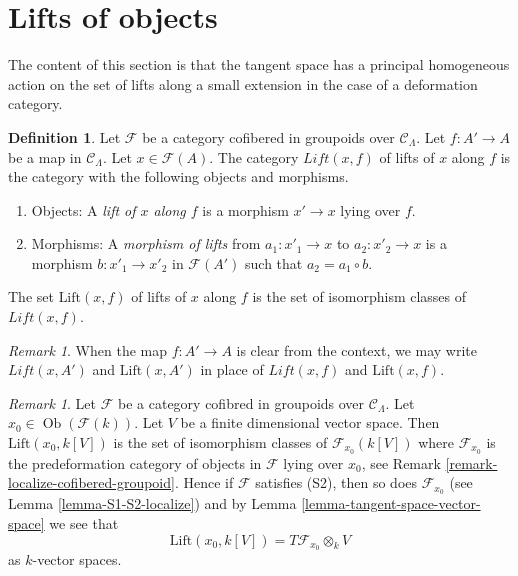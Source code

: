 \documentclass{stacks-project}
\theoremstyle{plain}
\theoremstyle{definition}
\newtheorem{definition}[subsection]{Definition}
\theoremstyle{remark}
\newtheorem{remark}[subsection]{Remark}
\numberwithin{equation}{subsection}
\def\Ob{\mathop{\mathrm{Ob}}\nolimits}
\begin{document}
\section{Lifts of objects}
\label{section-lifts}

\noindent
The content of this section is that the tangent space has a principal
homogeneous action on the set of lifts along a small extension
in the case of a deformation category.

\begin{definition}
\label{definition-lifts}
Let $\mathcal{F}$ be a category cofibered in groupoids over
$\mathcal{C}_\Lambda$. Let $f: A' \to A$ be a map in $\mathcal{C}_\Lambda$.
Let $x \in \mathcal{F}(A)$. The category $\textit{Lift}(x, f)$ of lifts of $x$
along $f$ is the category with the following objects and
morphisms.
\begin{enumerate}
\item Objects: A {\it lift of $x$ along $f$} is a morphism $x' \to x$
lying over $f$.
\item Morphisms: A {\it morphism of lifts} from $a_1 : x'_1 \to x$ to
$a_2 : x'_2 \to x$ is a morphism $b : x'_1 \to x'_2$ in
$\mathcal{F}(A')$ such that $a_2 = a_1 \circ b$.
\end{enumerate}
The set $\text{Lift}(x, f)$ of lifts of $x$ along $f$ is the set of
isomorphism classes of $\textit{Lift}(x, f)$.
\end{definition}

\begin{remark}
\label{remark-omit-arrow}
When the map $f: A' \to A$ is clear from the context, we may write
$\textit{Lift}(x, A')$ and $\text{Lift}(x, A')$ in place of
$\textit{Lift}(x, f)$ and $\text{Lift}(x, f)$.
\end{remark}

\begin{remark}
\label{remark-tangent-space-lifting}
Let $\mathcal{F}$ be a category cofibred in groupoids over
$\mathcal{C}_\Lambda$. Let $x_0 \in \Ob(\mathcal{F}(k))$.
Let $V$ be a finite dimensional vector space.
Then $\text{Lift}(x_0, k[V])$ is the set of isomorphism classes
of $\mathcal{F}_{x_0}(k[V])$ where $\mathcal{F}_{x_0}$ is the
predeformation category of objects in $\mathcal{F}$ lying over
$x_0$, see
Remark \ref{remark-localize-cofibered-groupoid}.
Hence if $\mathcal{F}$ satisfies (S2), then so does
$\mathcal{F}_{x_0}$ (see
Lemma \ref{lemma-S1-S2-localize})
and by
Lemma \ref{lemma-tangent-space-vector-space}
we see that
$$
\text{Lift}(x_0, k[V]) = T\mathcal{F}_{x_0} \otimes_k V
$$
as $k$-vector spaces.
\end{remark}
\end{document}
